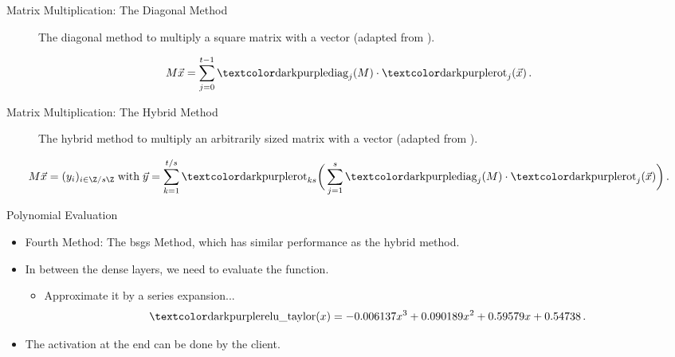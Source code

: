 \begin{frame}{Matrix Multiplication: The Diagonal Method}
  \begin{figure}[H]
    \centering
    \hspace{\matmulhoffset}
    \caption[Diagonal matrix multiplication method]{The diagonal method to multiply a square matrix with a vector (adapted from \cite{2018-gazelle}).}
    \label{fig:diagonal-method}
  \end{figure}

  $$M \vec{x} = \sum_{j=0}^{t-1} \diag_j(M) \cdot \rot_j(\vec{x}) \,.$$
\end{frame}

\begin{frame}{Matrix Multiplication: The Hybrid Method}
  \begin{figure}[H]
    \centering
    \hspace{\matmulhoffset}
    \caption[Hybrid matrix multiplication method]{The hybrid method to multiply an arbitrarily sized matrix with a vector (adapted from \cite{2018-gazelle}).}
    \label{fig:hybrid-method}
  \end{figure}

  $$M \vec{x} = (y_i)_{i \in \Z/s\Z} \;\text{with}\; \vec{y} = \sum_{k=1}^{t / s} \rot_{ks}\bigg(\sum_{j=1}^s \diag_j(M) \cdot \rot_j(\vec{x})\bigg) \,.$$
\end{frame}

\begin{frame}{Polynomial Evaluation}
  \begin{itemize}
    \item Fourth Method: The \gls{bsgs} Method, which has similar performance as the hybrid method.
    \item In between the dense layers, we need to evaluate the  function.
          \begin{itemize}
            \item Approximate it by a series expansion...
                  $$\cryptop{relu\_taylor}(x) = -0.006137 x^3 + 0.090189 x^2 + 0.59579 x + 0.54738 \,.$$
          \end{itemize}
    \item The  activation at the end can be done by the client.
  \end{itemize}
\end{frame}
